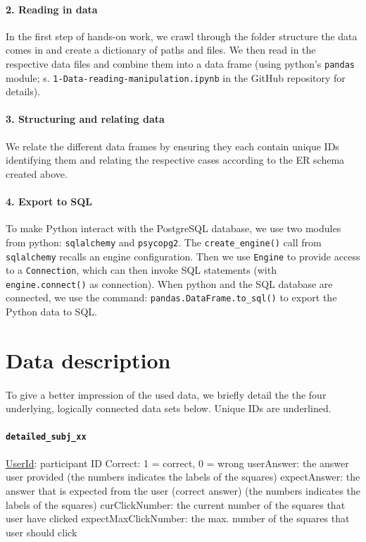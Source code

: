 \documentclass[11pt]{article}
\begin{document}
	\paragraph{2. Reading in data}
		In the first step of hands-on work, we crawl through the folder structure the data comes in and create a dictionary of paths and files. We then read in the respective data files and combine them into a data frame (using python's \texttt{pandas} module; s. \texttt{1-Data-reading-manipulation.ipynb} in the GitHub repository for details).
	\paragraph{3. Structuring and relating data}
		We relate the different data frames by ensuring they each contain unique IDs identifying them and relating the respective cases according to the ER schema created above.
	\paragraph{4. Export to SQL}
		To make Python interact with the PostgreSQL database, we use two modules from python: \texttt{sqlalchemy} and \texttt{psycopg2}. The \texttt{create\_engine()} call from \texttt{sqlalchemy} recalls an engine configuration. Then we use \texttt{Engine} to provide access to a \texttt{Connection}, which can then invoke SQL statements (with \texttt{engine.connect()} as connection). When python and the SQL database are connected, we use the command: \texttt{pandas.DataFrame.to\_sql()} to export the Python data to SQL.
\newpage
\section*{Data description}
	\paragraph{}
		To give a better impression of the used data, we briefly detail the the four underlying, logically connected data sets below. Unique IDs are underlined.
	\paragraph{\texttt{detailed\_subj\_xx}}
		\begin{itemize}
			\costitem \underline{UserId}: participant ID
			\costitem Correct: 1 = correct, 0 = wrong
			\costitem userAnswer: the answer user provided (the numbers indicates the labels of the squares)
			\costitem expectAnswer: the answer that is expected from the user (correct answer) (the numbers indicates the labels of the squares)
			\costitem curClickNumber: the current number of the squares that user have clicked 
			\costitem expectMaxClickNumber: the max. number of the squares that user should click
		\end{itemize}
\end{document}
